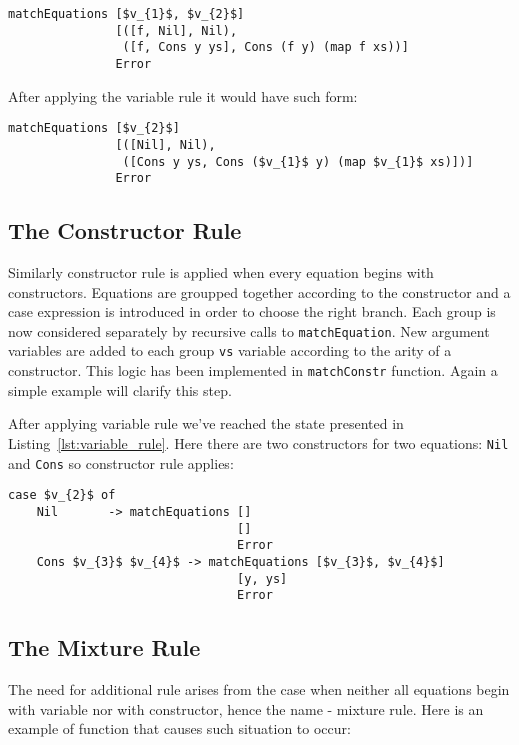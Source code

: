 \documentclass[12pt,a4paper]{report}
\begin{document}
\hspace*{-1.5in}
\begin{lstlisting}[style=haskell,mathescape=true]
matchEquations [$v_{1}$, $v_{2}$]
               [([f, Nil], Nil),
                ([f, Cons y ys], Cons (f y) (map f xs))]
               Error
\end{lstlisting}
After applying the variable rule it would have such form:

\hspace*{-1.5in}
\begin{lstlisting}[style=haskell,label=lst:variable_rule, caption={State after applying
  variable rule.}, mathescape=true]
matchEquations [$v_{2}$]
               [([Nil], Nil),
                ([Cons y ys, Cons ($v_{1}$ y) (map $v_{1}$ xs)])]
               Error
\end{lstlisting}

\subsection{The Constructor Rule}
\label{sec:constructor_rule}
Similarly constructor rule is applied when every equation begins with
constructors. Equations are groupped together according to the constructor and
a case expression is introduced in order to choose the right branch. Each group
is now considered separately by recursive calls to \texttt{matchEquation}. New
argument variables are added to each group \texttt{vs} variable according to
the arity of a constructor. This logic has been implemented in
\texttt{matchConstr} function. Again a simple example will clarify this step.

After applying variable rule we've reached the state presented in
Listing~\ref{lst:variable_rule}. Here there are two constructors for two
equations: \texttt{Nil} and \texttt{Cons} so constructor rule applies:

\hspace*{-1.5in}
\begin{lstlisting}[style=haskell,label=lst:constructor_rule, caption={State after applying
  constructor rule.}, mathescape=true]
case $v_{2}$ of
    Nil       -> matchEquations []
                                []
                                Error
    Cons $v_{3}$ $v_{4}$ -> matchEquations [$v_{3}$, $v_{4}$]
                                [y, ys]
                                Error
\end{lstlisting}

\subsection{The Mixture Rule}
The need for additional rule arises from the case when neither all equations
begin with variable nor with constructor, hence the name - mixture rule. Here
is an example of function that causes such situation to occur:
\end{document}
